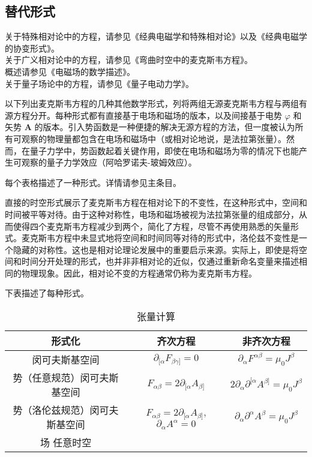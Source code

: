 \subsection{替代形式}
 关于特殊相对论中的方程，请参见《经典电磁学和特殊相对论》以及《经典电磁学的协变形式》。\\
 关于广义相对论中的方程，请参见《弯曲时空中的麦克斯韦方程》。\\
 概述请参见《电磁场的数学描述》。\\
 关于量子场论中的方程，请参见《量子电动力学》。

以下列出麦克斯韦方程的几种其他数学形式，列将两组无源麦克斯韦方程与两组有源方程分开。每种形式都有直接基于电场和磁场的版本，以及间接基于电势 \(\varphi\) 和矢势 \(\mathbf{A}\) 的版本。引入势函数是一种便捷的解决无源方程的方法，但一度被认为所有可观察的物理量都包含在电场和磁场中（或相对论地说，是法拉第张量）。然而，在量子力学中，势函数起着关键作用，即使在电场和磁场为零的情况下也能产生可观察的量子力学效应（阿哈罗诺夫-玻姆效应）。

每个表格描述了一种形式。详情请参见主条目。

直接的时空形式展示了麦克斯韦方程在相对论下的不变性，在这种形式中，空间和时间被平等对待。由于这种对称性，电场和磁场被视为法拉第张量的组成部分，从而使得四个麦克斯韦方程减少到两个，简化了方程，尽管不再使用熟悉的矢量形式。麦克斯韦方程中未显式地将空间和时间同等对待的形式中，洛伦兹不变性是一个隐藏的对称性。这也是相对论理论发展中的重要启示来源。实际上，即使是将空间和时间分开处理的形式，也并非非相对论的近似，仅通过重新命名变量来描述相同的物理现象。因此，相对论不变的方程通常仍称为麦克斯韦方程。

下表描述了每种形式。

\begin{table}[ht]
\centering
\caption{张量计算}\label{MAXS3}
\begin{tabular}{|c|c|c|}
\hline \textbf{形式化} & \textbf{齐次方程} & \textbf{非齐次方程} \\
\hline 闵可夫斯基空间 & \(\partial_{[\alpha} F_{\beta \gamma]} = 0\)& \(\partial_{\alpha} F^{\alpha \beta} = \mu_0 J^{\beta}\) \\
\hline 势（任意规范）闵可夫斯基空间 & \({\displaystyle F_{\alpha \beta }=2\partial _{[\alpha }A_{\beta ]}}\)&\(2 \partial_{\alpha} \partial^{[\alpha} A^{\beta]} = \mu_{0} J^{\beta}\) \\
\hline 势（洛伦兹规范）闵可夫斯基空间&\({\displaystyle F_{\alpha \beta }=2\partial _{[\alpha }A_{\beta ]}}\),\(\partial _{\alpha }A^{\alpha }=0\)&\(\partial _{\alpha }\partial ^{\alpha }A^{\beta }=\mu _{0}J^{\beta }\)\\
\hline 场  任意时空&
\hline 
\end{tabular}
\end{table}


